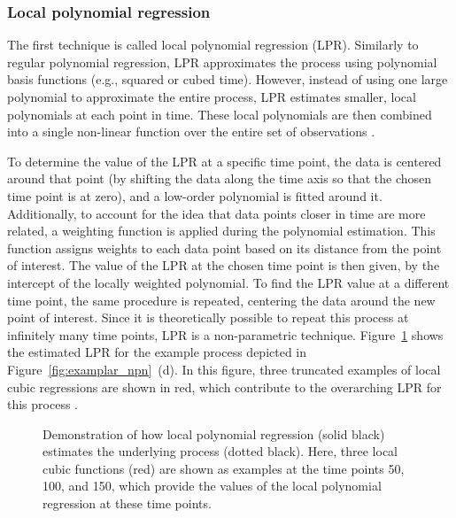 \documentclass[man, floatsintext]{apa7}
\begin{document}
\subsubsection{Local polynomial regression}

The first technique is called local polynomial regression (LPR). Similarly to
regular polynomial regression, LPR approximates the process using polynomial
basis functions (e.g., squared or cubed time). However, instead of using one
large polynomial to approximate the entire process, LPR estimates smaller,
local polynomials at each point in time. These local polynomials are then
combined into a single non-linear function over the entire set of observations
\parencite{fan_adaptive_1995, ruppert_multivariate_1994, fan_local_2018}.

To determine the value of the LPR at a specific time point, the data is
centered around that point (by shifting the data along the time axis so
that the chosen time point is at zero), and a low-order polynomial is fitted
around it. Additionally, to account for the idea that data points closer in
time are more related, a weighting function is applied during the polynomial
estimation. This function assigns weights to each data point based on its
distance from the point of interest. The value of the LPR at the chosen
time point is then given, by the intercept of the locally weighted polynomial.
To find the LPR value at a different time
point, the same procedure is repeated, centering the data around the new point
of interest. Since it is theoretically possible to repeat this process at
infinitely many
time points, LPR is a non-parametric technique. Figure~\ref{fig:locpol_dem}
shows the estimated LPR for the example process depicted in
Figure~\ref{fig:examplar_npn}~(d).  In this figure, three truncated examples of
local cubic regressions are shown
in red, which contribute to the overarching LPR for this process .\@

\begin{figure}[!ht]
  \caption{Demonstration of how local polynomial regression (solid black)
    estimates the underlying process (dotted black). Here, three local cubic
    functions (red) are shown as examples at the time points 50, 100, and 150,
    which provide the values of the local polynomial regression at these time
    points.}
  \label{fig:locpol_dem}
\end{figure}
\end{document}
